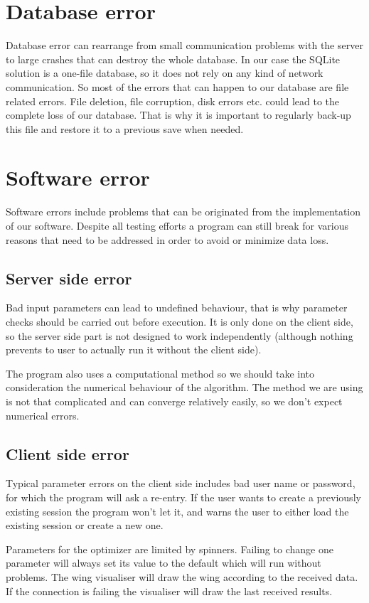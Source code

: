 \documentclass[10pt,a4paper]{report}
\begin{document}
\section{Database error}
Database error can rearrange from small communication problems with the server to large crashes that can destroy the whole database. In our case the SQLite solution is a one-file database, so it does not rely on any kind of network communication. So most of the errors that can happen to our database are file related errors. File deletion, file corruption, disk errors etc. could lead to the complete loss of our database. That is why it is important to regularly back-up this file and restore it to a previous save when needed.

\section{Software error}
Software errors include problems that can be originated from the implementation of our software. Despite all testing efforts a program can still break for various reasons that need to be addressed in order to avoid or minimize data loss. 

\subsection{Server side error}
Bad input parameters can lead to undefined behaviour, that is why parameter checks should be carried out before execution. It is only done on the client side, so the server side part is not designed to work independently (although nothing prevents to user to actually run it without the client side).

The program also uses a computational method so we should take into consideration the numerical behaviour of the algorithm. The method we are using is not that complicated and can converge relatively easily, so we don't expect numerical errors.

\subsection{Client side error}
Typical parameter errors on the client side includes bad user name or password, for which the program will ask a re-entry. If the user wants to create a previously existing session the program won't let it, and warns the user to either load the existing session or create a new one.

Parameters for the optimizer are limited by spinners. Failing to change one parameter will always set its value to the default which will run without problems. The wing visualiser will draw the wing according to the received data. If the connection is failing the visualiser will draw the last received results.
\end{document}
